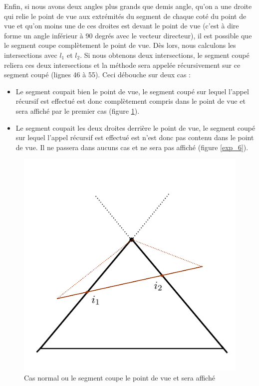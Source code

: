 \documentclass[11pt,a4paper]{article}
\theoremstyle{definition}
\theoremstyle{remark}
\begin{document}
Enfin, si nous avons deux angles plus grands que demis angle, qu'on a une droite qui relie le point de vue aux extrémités du segment de chaque coté du point de vue et qu'on moins une de ces droites est devant le point de vue (c'est à dire forme un angle inférieur à 90 degrés avec le vecteur directeur), il est possible que le segment coupe complètement le point de vue. Dès lors, nous calculons les intersections avec $l_1$ et $l_2$. Si nous obtenons deux intersections, le segment coupé reliera ces deux intersections et la méthode sera appelée récursivement sur ce segment coupé (lignes 46 à 55). Ceci débouche sur deux cas :\\

\begin{itemize}
	\item Le segment coupait bien le point de vue, le segment coupé sur lequel l'appel récursif est effectué est donc complètement compris dans le point de vue et sera affiché par le premier cas (figure \ref{exp_5}).
	\item Le segment coupait les deux droites derrière le point de vue, le segment coupé sur lequel l'appel récursif est effectué est n'est donc pas contenu dans le point de vue. Il ne passera dans aucuns cas et ne sera pas affiché (figure \ref{exp_6}).
\end{itemize}

\begin{figure}[H]
\centering
\includegraphics[scale=0.4]{casSpecial2.png}
\caption{Cas normal ou le segment coupe le point de vue et sera affiché}
\label{exp_5}
\end{figure}
\end{document}
